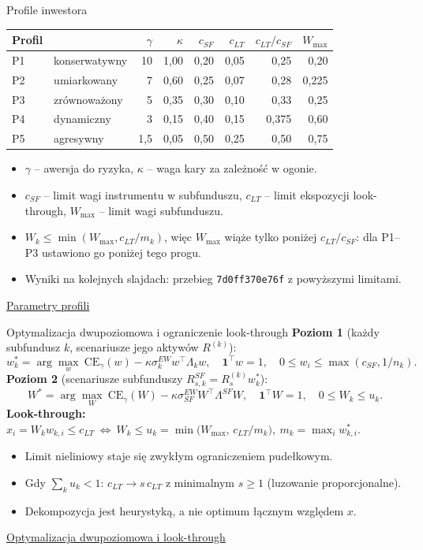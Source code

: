 \documentclass[aspectratio=169,11pt]{beamer}
\newcommand{\repo}{https://github.com/michalmarchwiak/bsc-project}
\newcommand{\rev}{9e941db56fde866672b262f5f6725268ce58feb7}
\newcommand{\src}[2]{\vfill{\scriptsize\color{Teal}%
  \href{\repo/blob/\rev/#1}{#2}}}
\begin{document}
\begin{frame}{Profile inwestora}
  \centering
  \begin{tabular}{llrrrrrr}
    \toprule
    Profil & & \(\gamma\) & \(\kappa\) & \(c_{SF}\) & \(c_{LT}\)
      & \(c_{LT}/c_{SF}\) & \(W_{\max}\)\\
    \midrule
    P1 & konserwatywny & 10  & 1,00 & 0,20 & 0,05 & 0,25  & 0,20\\
    P2 & umiarkowany   & 7   & 0,60 & 0,25 & 0,07 & 0,28  & 0,225\\
    P3 & zrównoważony  & 5   & 0,35 & 0,30 & 0,10 & 0,33  & 0,25\\
    P4 & dynamiczny    & 3   & 0,15 & 0,40 & 0,15 & 0,375 & 0,60\\
    P5 & agresywny     & 1,5 & 0,05 & 0,50 & 0,25 & 0,50  & 0,75\\
    \bottomrule
  \end{tabular}
  \raggedright\medskip
  \begin{itemize}
    \item \(\gamma\) -- awersja do ryzyka, \(\kappa\) -- waga kary za
      zależność w ogonie.
    \item \(c_{SF}\) -- limit wagi instrumentu w subfunduszu,
      \(c_{LT}\) -- limit ekspozycji look-through,
      \(W_{\max}\) -- limit wagi subfunduszu.
    \item \(W_k\le\min(W_{\max},c_{LT}/m_k)\), więc \(W_{\max}\) wiąże
      tylko poniżej \(c_{LT}/c_{SF}\): dla P1--P3 ustawiono go poniżej
      tego progu.
    \item Wyniki na kolejnych slajdach: przebieg \texttt{7d0ff370e76f}
      z powyższymi limitami.
  \end{itemize}
  \src{config/profiles.yaml}{Parametry profili}
\end{frame}

\begin{frame}{Optymalizacja dwupoziomowa i ograniczenie look-through}
  \textbf{Poziom 1} (każdy subfundusz \(k\), scenariusze jego aktywów \(R^{(k)}\)):
  \[
    w_k^*=\arg\max_{w}\ \mathrm{CE}_\gamma(w)-\kappa\sigma_k^{EW}w^\top\Lambda_k w,
    \quad \mathbf 1^\top w=1,\quad 0\le w_i\le\max(c_{SF},1/n_k).
  \]
  \textbf{Poziom 2} (scenariusze subfunduszy \(R^{SF}_{s,k}=R^{(k)}_s w_k^*\)):
  \[
    W^*=\arg\max_{W}\ \mathrm{CE}_\gamma(W)-\kappa\sigma^{EW}_{SF}W^\top\Lambda^{SF}W,
    \quad \mathbf 1^\top W=1,\quad 0\le W_k\le u_k .
  \]
  \textbf{Look-through:}
  \(x_i=W_k w_{k,i}\le c_{LT}\ \Leftrightarrow\
    W_k\le u_k=\min\bigl(W_{\max},\,c_{LT}/m_k\bigr),\ m_k=\max_i w_{k,i}^*\).
  \begin{itemize}
    \item Limit nieliniowy staje się zwykłym ograniczeniem pudełkowym.
    \item Gdy \(\sum_k u_k<1\): \(c_{LT}\to s\,c_{LT}\) z minimalnym
      \(s\ge1\) (luzowanie proporcjonalne).
    \item Dekompozycja jest heurystyką, a nie optimum łącznym względem \(x\).
  \end{itemize}
  \src{src/pf/opt/profiles.py}{Optymalizacja dwupoziomowa i look-through}
\end{frame}
\end{document}

